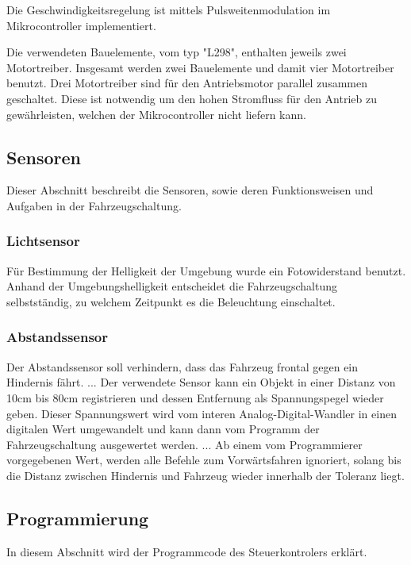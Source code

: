 \documentclass{scrartcl}
\begin{document}

		Die Geschwindigkeitsregelung ist mittels Pulsweitenmodulation im Mikrocontroller implementiert.

		Die verwendeten Bauelemente, vom typ "L298", enthalten jeweils zwei Motortreiber.
		Insgesamt werden zwei Bauelemente und damit vier Motortreiber benutzt.
		Drei Motortreiber sind für den Antriebsmotor parallel zusammen geschaltet.
		Diese ist notwendig um den hohen Stromfluss für den Antrieb zu gewährleisten,
		welchen der Mikrocontroller nicht liefern kann.
		
	
	\subsection{Sensoren}
		Dieser Abschnitt beschreibt die Sensoren, sowie deren Funktionsweisen und Aufgaben
		in der Fahrzeugschaltung.
		\subsubsection{Lichtsensor} %
			Für Bestimmung der Helligkeit der Umgebung wurde ein Fotowiderstand benutzt.
			Anhand der Umgebungshelligkeit entscheidet die Fahrzeugschaltung selbstständig,
			zu welchem Zeitpunkt es die Beleuchtung einschaltet.
		\subsubsection{Abstandssensor} %
			Der Abstandssensor soll verhindern, dass das Fahrzeug frontal gegen ein Hindernis fährt.
			...
			Der verwendete Sensor kann ein Objekt in einer Distanz von 10cm bis 80cm registrieren
			und dessen Entfernung als Spannungspegel wieder geben. Dieser Spannungswert wird vom
			interen Analog-Digital-Wandler in einen digitalen Wert umgewandelt und kann dann vom
			Programm der Fahrzeugschaltung ausgewertet werden.
			...
			Ab einem vom Programmierer vorgegebenen Wert, werden alle Befehle zum Vorwärtsfahren
			ignoriert, solang bis die Distanz zwischen Hindernis und Fahrzeug wieder innerhalb
			der Toleranz liegt.
	
	\subsection{Programmierung} %
		In diesem Abschnitt wird der Programmcode des Steuerkontrolers erklärt.
\end{document}
